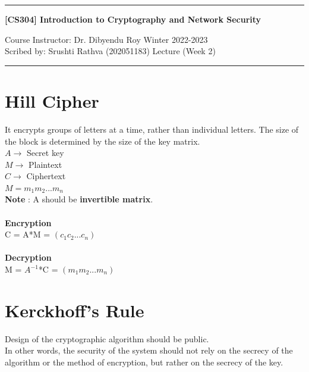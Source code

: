 \documentclass[11pt]{article}
\begin{document}
\noindent
\rule{\textwidth}{1pt}
\begin{center}
{\bf [CS304] Introduction to Cryptography and Network Security}
\end{center}
Course Instructor: Dr. Dibyendu Roy \hfill Winter 2022-2023\\
Scribed by: Srushti Rathva (202051183) \hfill Lecture (Week 2)
\\
\rule{\textwidth}{1pt}

\section*{Hill Cipher}
It encrypts groups of letters at a time, rather than individual letters. The size of the block is determined by the size of the key matrix. \\
$ A \rightarrow $ Secret key \\
$ M \rightarrow $ Plaintext \\
$ C \rightarrow $ Ciphertext \\
$ M = m_1 m_2 ... m_n $ \\
\textbf{Note} : A should be \textbf{invertible matrix}.
\\ \\
\textbf{Encryption} \\
C = A*M = $ (c_1 c_2 ... c_n) $ 
\\ \\ 
\textbf{Decryption} \\
M = $ A^{-1} $*C = $ (m_1 m_2 ... m_n) $ 

\section*{Kerckhoff's Rule}
Design of the cryptographic algorithm should be public.\\
In other words, the security of the system should not rely on the secrecy of the algorithm or the method of encryption, but rather on the secrecy of the key. 
\end{document}
